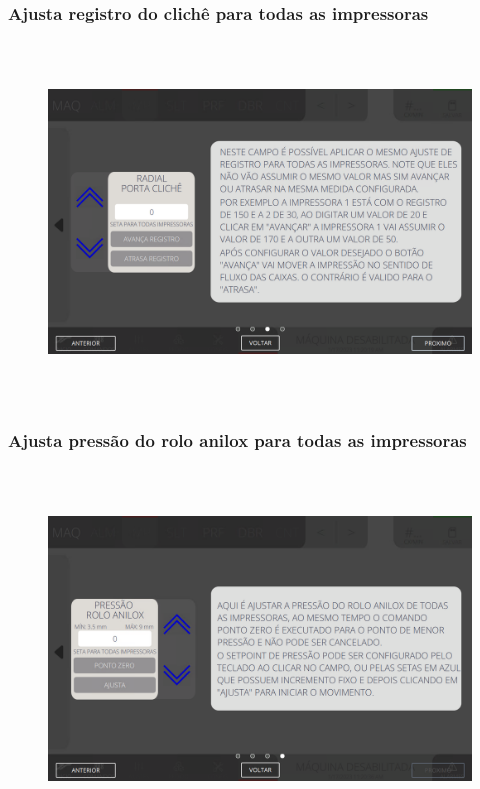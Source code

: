 \newpage
\thispagestyle{fancy}
\vspace*{\fill}
\subsubsection{\small{Ajusta registro do clichê para todas as impressoras}}
\begin{figure}[h]
  \centering
  \includegraphics[width=576px,height=360px]{src/imagesFlexo/04-printter/01-printters/settings/e-11.png}
\end{figure}
\vspace*{\fill}

\newpage
\thispagestyle{fancy}
\vspace*{\fill}
\subsubsection{\small{Ajusta pressão do rolo anilox para todas as impressoras}}
\begin{figure}[h]
  \centering
  \includegraphics[width=576px,height=360px]{src/imagesFlexo/04-printter/01-printters/settings/e-12.png}
\end{figure}
\vspace*{\fill}
